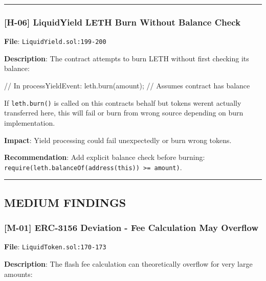 \documentclass[
]{article}
\newenvironment{Shaded}{}{}
\newcommand{\NormalTok}[1]{#1}
\begin{document}
\begin{center}\rule{0.5\linewidth}{0.5pt}\end{center}

\subsubsection{{[}H-06{]} LiquidYield LETH Burn Without Balance
Check}\label{h-06-liquidyield-leth-burn-without-balance-check}

\textbf{File}: \texttt{LiquidYield.sol:199-200}

\textbf{Description}: The contract attempts to burn LETH without first
checking its balance:

\begin{Shaded}
\begin{Highlighting}[]
\NormalTok{// In processYieldEvent:}
\NormalTok{leth.burn(amount);  // Assumes contract has balance}
\end{Highlighting}
\end{Shaded}

If \texttt{leth.burn()} is called on this contract\textquotesingle s
behalf but tokens weren\textquotesingle t actually transferred here,
this will fail or burn from wrong source depending on burn
implementation.

\textbf{Impact}: Yield processing could fail unexpectedly or burn wrong
tokens.

\textbf{Recommendation}: Add explicit balance check before burning:
\texttt{require(leth.balanceOf(address(this))\ \textgreater{}=\ amount)}.

\begin{center}\rule{0.5\linewidth}{0.5pt}\end{center}

\subsection{MEDIUM FINDINGS}\label{medium-findings}

\subsubsection{{[}M-01{]} ERC-3156 Deviation - Fee Calculation May
Overflow}\label{m-01-erc-3156-deviation---fee-calculation-may-overflow}

\textbf{File}: \texttt{LiquidToken.sol:170-173}

\textbf{Description}: The flash fee calculation can theoretically
overflow for very large amounts:
\end{document}
